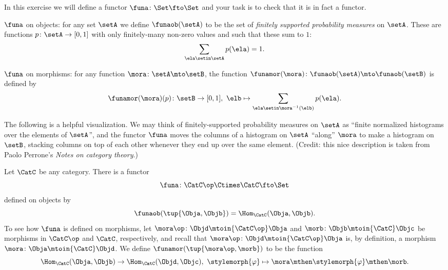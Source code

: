 \begin{gradedexercise}
\label{ex:probability-functor}

In this exercise we will define a functor $\funa \colon \Set \fto \Set$ and your task is to check that it is in fact a functor. 

$\funa$ on objects: for any set $\setA$ we define $\funaob(\setA)$ to be the set of \emph{finitely supported probability measures} on $\setA$. These are functions $p \colon \setA \to [0,1]$ with only finitely-many non-zero values and such that these sum to $1$:
\begin{equation}
\sum_{\ela \setin \setA} p(\ela) = 1. 
\end{equation}

$\funa$ on morphisms: for any function $\mora \colon \setA \mto \setB$, the function $\funamor(\mora) \colon \funaob(\setA) \mto \funaob(\setB)$ is defined by
\begin{equation}
\funamor(\mora)(p) \colon \setB \to [0,1], \ \elb \mapsto \sum_{\ela \setin \mora^{-1}(\elb)} p(\ela). 
\end{equation}

The following is a helpful visualization. We may think of finitely-supported probability measures on $\setA$ as ``finite normalized histograms over the elements of $\setA$'', and the functor $\funa$ moves the columns of a histogram on $\setA$ ``along'' $\mora$ to make a histogram on $\setB$, stacking columns on top of each other whenever they end up over the same element. (Credit: this nice description is taken from Paolo Perrone's \emph{Notes on category theory}.)
\end{gradedexercise}


\begin{example}\label{exa:hom-functor}
    Let $\CatC$ be any category.
    There is a functor
    \begin{equation}\label{eq:hom-functor-type}
        \funa \colon \CatC\op \Ctimes \CatC \fto \Set
    \end{equation}
    defined on objects by
    \begin{equation}\label{eq:hom-functor-on-objects}
        \funaob(\tup{\Obja, \Objb}) = \Hom_\CatC(\Obja, \Objb).
    \end{equation}
    To see how $\funa$ is defined on morphisms, let $\mora\op \colon \Objd \mtoin{\CatC\op} \Obja$ and $\morb \colon \Objb \mtoin{\CatC} \Objc$ be morphisms in $\CatC\op$ and $\CatC$, respectively, and recall that $\mora\op \colon \Objd \mtoin{\CatC\op} \Obja$ is, by definition, a morphism $\mora \colon \Obja \mtoin{\CatC} \Objd$.
    We define $\funamor(\tup{\mora\op, \morb})$ to be the function
    \begin{equation}\label{eq:hom-functor-on-morphisms}
        \Hom_\CatC(\Obja, \Objb) \to \Hom_\CatC(\Objd, \Objc), \ \stylemorph{\varphi} \mapsto \mora \mthen \stylemorph{\varphi} \mthen \morb.
    \end{equation}

\end{example}

